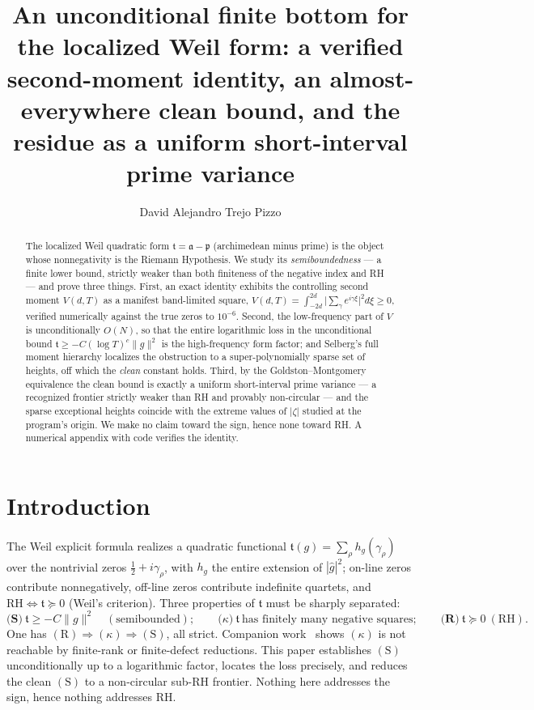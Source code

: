 \documentclass[11pt]{amsart}
\title[An Unconditional Finite Bottom]{An unconditional finite bottom for the localized Weil form: a verified
second-moment identity, an almost-everywhere clean bound, and the residue as a
uniform short-interval prime variance}
\author{David Alejandro Trejo Pizzo}
\theoremstyle{definition}
\theoremstyle{remark}
\newcommand{\fa}{\mathfrak a}
\newcommand{\fp}{\mathfrak p}
\newcommand{\ft}{\mathfrak t}
\newcommand{\RH}{\mathrm{RH}}
\begin{document}
\nocite{bgSound,bgRS,bgFHK,bgMV,bgIK}
\begin{abstract}
The localized Weil quadratic form $\ft=\fa-\fp$ (archimedean minus prime) is the
object whose nonnegativity is the Riemann Hypothesis. We study its
\emph{semiboundedness} --- a finite lower bound, strictly weaker than both
finiteness of the negative index and RH --- and prove three things. First, an
exact identity exhibits the controlling second moment $V(d,T)$ as a manifest
band-limited square, $V(d,T)=\int_{-2d}^{2d}\bigl|\sum_\gamma e^{i\gamma\xi}\bigr|^2
d\xi\ge0$, verified numerically against the true zeros to $10^{-6}$. Second, the
low-frequency part of $V$ is unconditionally $O(N)$, so that the entire
logarithmic loss in the unconditional bound $\ft\ge-C(\log T)^c\|g\|^2$ is the
high-frequency form factor; and Selberg's full moment hierarchy localizes the
obstruction to a super-polynomially sparse set of heights, off which the
\emph{clean} constant holds. Third, by the Goldston--Montgomery equivalence the
clean bound is exactly a uniform short-interval prime variance --- a recognized
frontier strictly weaker than RH and provably non-circular --- and the sparse
exceptional heights coincide with the extreme values of $|\zeta|$ studied at the
program's origin. We make no claim toward the sign, hence none toward RH. A
numerical appendix with code verifies the identity.
\end{abstract}
\maketitle

\tableofcontents
\newpage

\section{Introduction}
The Weil explicit formula realizes a quadratic functional $\ft(g)=\sum_\rho
h_g(\gamma_\rho)$ over the nontrivial zeros $\tfrac12+i\gamma_\rho$, with $h_g$
the entire extension of $|\widehat g|^2$; on-line zeros contribute nonnegatively,
off-line zeros contribute indefinite quartets, and $\RH\iff\ft\succeq0$ (Weil's
criterion). Three properties of $\ft$ must be sharply separated:
\[
\textbf{(S)}\ \ft\ge-C\|g\|^2\quad(\text{semibounded});\qquad
\textbf{($\kappa$)}\ \ft\ \text{has finitely many negative squares};\qquad
\textbf{(R)}\ \ft\succeq0\ (\RH).
\]
One has $(\mathrm R)\Rightarrow(\kappa)\Rightarrow(\mathrm S)$, all strict.
Companion work~\cite{RP16} shows $(\kappa)$ is not reachable by finite-rank or
finite-defect reductions. This paper establishes $(\mathrm S)$ unconditionally up
to a logarithmic factor, locates the loss precisely, and reduces the clean
$(\mathrm S)$ to a non-circular sub-RH frontier. Nothing here addresses the sign,
hence nothing addresses RH.
\end{document}

